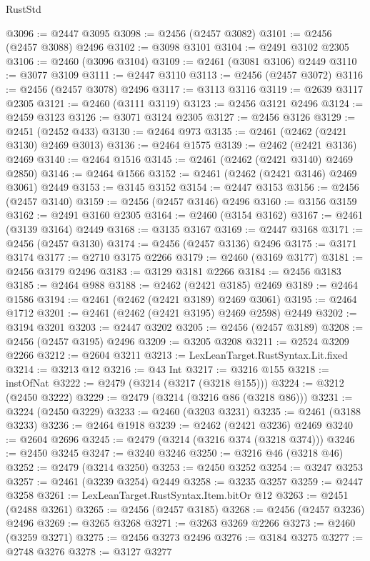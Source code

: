\begin{lexlean}{RustStd}
\begin{coremodule}
@3096 := @2447 @3095
@3098 := @2456 (@2457 @3082)
@3101 := @2456 (@2457 @3088) @2496
@3102 := @3098 @3101
@3104 := @2491 @3102 @2305
@3106 := @2460 (@3096 @3104)
@3109 := @2461 (@3081 @3106) @2449
@3110 := @3077 @3109
@3111 := @2447 @3110
@3113 := @2456 (@2457 @3072)
@3116 := @2456 (@2457 @3078) @2496
@3117 := @3113 @3116
@3119 := @2639 @3117 @2305
@3121 := @2460 (@3111 @3119)
@3123 := @2456 @3121 @2496
@3124 := @2459 @3123
@3126 := @3071 @3124 @2305
@3127 := @2456 @3126
@3129 := @2451 (@2452 @433)
@3130 := @2464 @973
@3135 := @2461 (@2462 (@2421 @3130) @2469 @3013)
@3136 := @2464 @1575
@3139 := @2462 (@2421 @3136) @2469
@3140 := @2464 @1516
@3145 := @2461 (@2462 (@2421 @3140) @2469 @2850)
@3146 := @2464 @1566
@3152 := @2461 (@2462 (@2421 @3146) @2469 @3061) @2449
@3153 := @3145 @3152
@3154 := @2447 @3153
@3156 := @2456 (@2457 @3140)
@3159 := @2456 (@2457 @3146) @2496
@3160 := @3156 @3159
@3162 := @2491 @3160 @2305
@3164 := @2460 (@3154 @3162)
@3167 := @2461 (@3139 @3164) @2449
@3168 := @3135 @3167
@3169 := @2447 @3168
@3171 := @2456 (@2457 @3130)
@3174 := @2456 (@2457 @3136) @2496
@3175 := @3171 @3174
@3177 := @2710 @3175 @2266
@3179 := @2460 (@3169 @3177)
@3181 := @2456 @3179 @2496
@3183 := @3129 @3181 @2266
@3184 := @2456 @3183
@3185 := @2464 @988
@3188 := @2462 (@2421 @3185) @2469
@3189 := @2464 @1586
@3194 := @2461 (@2462 (@2421 @3189) @2469 @3061)
@3195 := @2464 @1712
@3201 := @2461 (@2462 (@2421 @3195) @2469 @2598) @2449
@3202 := @3194 @3201
@3203 := @2447 @3202
@3205 := @2456 (@2457 @3189)
@3208 := @2456 (@2457 @3195) @2496
@3209 := @3205 @3208
@3211 := @2524 @3209 @2266
@3212 := @2604 @3211
@3213 := LexLeanTarget.RustSyntax.Lit.fixed
@3214 := @3213 @12
@3216 := @43 Int
@3217 := @3216 @155
@3218 := instOfNat
@3222 := @2479 (@3214 (@3217 (@3218 @155)))
@3224 := @3212 (@2450 @3222)
@3229 := @2479 (@3214 (@3216 @86 (@3218 @86)))
@3231 := @3224 (@2450 @3229)
@3233 := @2460 (@3203 @3231)
@3235 := @2461 (@3188 @3233)
@3236 := @2464 @1918
@3239 := @2462 (@2421 @3236) @2469
@3240 := @2604 @2696
@3245 := @2479 (@3214 (@3216 @374 (@3218 @374)))
@3246 := @2450 @3245
@3247 := @3240 @3246
@3250 := @3216 @46 (@3218 @46)
@3252 := @2479 (@3214 @3250)
@3253 := @2450 @3252
@3254 := @3247 @3253
@3257 := @2461 (@3239 @3254) @2449
@3258 := @3235 @3257
@3259 := @2447 @3258
@3261 := LexLeanTarget.RustSyntax.Item.bitOr @12
@3263 := @2451 (@2488 @3261)
@3265 := @2456 (@2457 @3185)
@3268 := @2456 (@2457 @3236) @2496
@3269 := @3265 @3268
@3271 := @3263 @3269 @2266
@3273 := @2460 (@3259 @3271)
@3275 := @2456 @3273 @2496
@3276 := @3184 @3275
@3277 := @2748 @3276
@3278 := @3127 @3277

\end{coremodule}
\end{lexlean}
